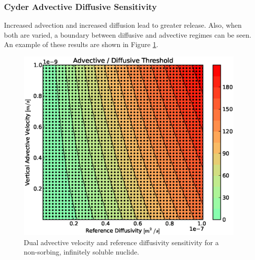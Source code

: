 \begin{frame}[ctb!]
\frametitle{Cyder Advective Diffusive Sensitivity}
Increased advection and increased diffusion lead to greater release. Also, when both are varied, a boundary between diffusive and advective
regimes can be seen. An example of these results are shown in Figure 
\ref{fig:dr_adv_diff}.
\begin{figure}[ht]
\centering
\includegraphics[width=\linewidth]{./nuclide_demonstration/adv_vel_diff.eps}
\caption[Advection vs. Diffusion Sensitivity in Cyder]{Dual advective velocity 
and reference diffusivity sensitivity for a non-sorbing, infinitely soluble 
nuclide.}
\label{fig:dr_adv_diff}
\end{figure}
\end{frame}
